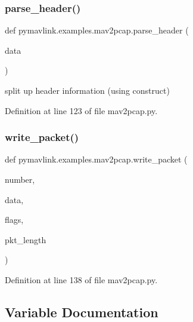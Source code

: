 \subsubsection{\texorpdfstring{parse\_header()}{parse\_header()}}
{\footnotesize\ttfamily def pymavlink.\+examples.\+mav2pcap.\+parse\+\_\+header (\begin{DoxyParamCaption}\item[{}]{data }\end{DoxyParamCaption})}

\begin{DoxyVerb}split up header information (using construct)
\end{DoxyVerb}
 

Definition at line 123 of file mav2pcap.\+py.

\mbox{\label{namespacepymavlink_1_1examples_1_1mav2pcap_a7e184064dd2bcc387dd8932017af128b}} 
\subsubsection{\texorpdfstring{write\_packet()}{write\_packet()}}
{\footnotesize\ttfamily def pymavlink.\+examples.\+mav2pcap.\+write\+\_\+packet (\begin{DoxyParamCaption}\item[{}]{number,  }\item[{}]{data,  }\item[{}]{flags,  }\item[{}]{pkt\+\_\+length }\end{DoxyParamCaption})}



Definition at line 138 of file mav2pcap.\+py.



\subsection{Variable Documentation}
\mbox{\label{namespacepymavlink_1_1examples_1_1mav2pcap_a4f3f0a2bfb0e63569e7be7a951c72324}} 
